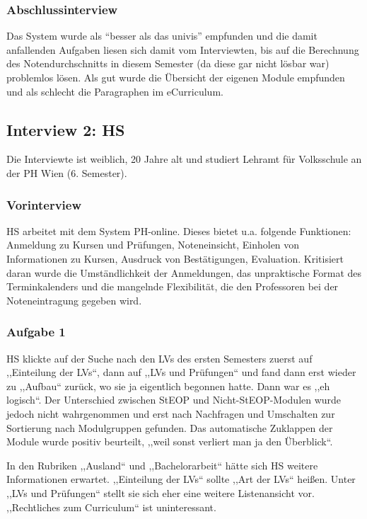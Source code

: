 \documentclass[a4paper,10pt]{scrartcl}
\begin{document}
\subsubsection*{Abschlussinterview}

Das System wurde als ``besser als das univis'' empfunden und die damit anfallenden Aufgaben liesen sich damit vom Interviewten, bis auf die Berechnung des Notendurchschnitts
in diesem Semester (da diese gar nicht lösbar war) problemlos lösen. Als gut wurde die Übersicht der eigenen Module empfunden und als schlecht die Paragraphen
im eCurriculum.

\subsection*{Interview 2: HS}

Die Interviewte ist weiblich, 20 Jahre alt und studiert Lehramt für Volksschule an der PH Wien (6. Semester).

\subsubsection*{Vorinterview}

HS arbeitet mit dem System PH-online. Dieses bietet u.a. folgende Funktionen: Anmeldung zu Kursen und Prüfungen, Noteneinsicht, Einholen von Informationen zu Kursen, Ausdruck von Bestätigungen, Evaluation. Kritisiert daran wurde die Umständlichkeit der Anmeldungen, das unpraktische Format des Terminkalenders und die mangelnde Flexibilität, die den Professoren bei der Noteneintragung gegeben wird.

\subsubsection*{Aufgabe 1}

HS klickte auf der Suche nach den LVs des ersten Semesters zuerst auf ,,Einteilung der LVs``, dann auf ,,LVs und Prüfungen`` und fand dann erst wieder zu ,,Aufbau`` zurück, wo sie ja eigentlich begonnen hatte. Dann war es ,,eh logisch``. Der Unterschied zwischen StEOP und Nicht-StEOP-Modulen wurde jedoch nicht wahrgenommen und erst nach Nachfragen und Umschalten zur Sortierung nach Modulgruppen gefunden. Das automatische Zuklappen der Module wurde positiv beurteilt, ,,weil sonst verliert man ja den Überblick``.

In den Rubriken ,,Ausland`` und ,,Bachelorarbeit`` hätte sich HS weitere Informationen erwartet. ,,Einteilung der LVs`` sollte ,,Art der LVs`` heißen. Unter ,,LVs und Prüfungen`` stellt sie sich eher eine weitere Listenansicht vor. ,,Rechtliches zum Curriculum`` ist uninteressant.
\end{document}
